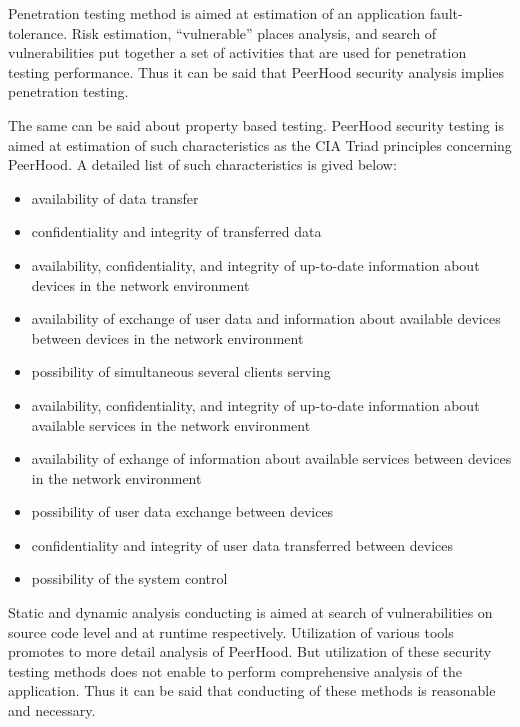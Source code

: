 %
Penetration testing method is aimed at estimation of an application fault-tolerance. 
%
Risk estimation, ``vulnerable'' places analysis, and search of vulnerabilities put together a set of activities that are used for penetration testing performance. 
%
Thus it can be said that PeerHood security analysis implies penetration testing. 

%
The same can be said about property based testing. 
%
PeerHood security testing is aimed at estimation of such characteristics as the CIA Triad principles concerning PeerHood. 
%
A detailed list of such characteristics is gived below:
\begin{itemize}
	\setlength{\itemsep}{0pt}%

	\item availability of data transfer
	\item confidentiality and integrity of transferred data

	\item availability, confidentiality, and integrity of up-to-date information about devices in the network environment
	\item availability of exchange of user data and information about available devices between devices in the network environment
	\item possibility of simultaneous several clients serving

	\item availability, confidentiality, and integrity of up-to-date information about available services in the network environment
	\item availability of exhange of information about available services between devices in the network environment

	\item possibility of user data exchange between devices
	\item confidentiality and integrity of user data transferred between devices
	\item possibility of the system control
\end{itemize}

%
Static and dynamic analysis conducting is aimed at search of vulnerabilities on source code level and at runtime respectively. 
%
Utilization of various tools promotes to more detail analysis of PeerHood. 
%
But utilization of these security testing methods does not enable to perform comprehensive analysis of the application. 
%
Thus it can be said that conducting of these methods is reasonable and necessary. 

